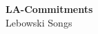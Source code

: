 \documentclass[a4paper]{article}
\begin{document}
\vspace*{\fill}
\begin{center}
  {\Huge\bfseries LA-Commitments}\\[1.5em]
  {\huge Lebowski Songs}
\end{center}
\vspace*{\fill}
\end{document}
